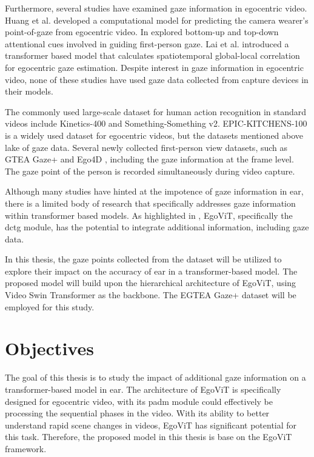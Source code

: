 Furthermore, several studies have examined gaze information in egocentric video. Huang et al. \cite{huang_predicting_2018} developed a computational model for predicting the camera wearer's point-of-gaze from egocentric video. In \cite{tavakoli_digging_2019} explored bottom-up and top-down attentional cues involved in guiding first-person gaze. Lai et al. \cite{lai_eye_2022} introduced a transformer based model that calculates spatiotemporal global-local correlation for egocentric gaze estimation. Despite interest in gaze information in egocentric video, none of these studies have used gaze data collected from capture devices in their models.

The commonly used large-scale dataset for human action recognition in standard videos include Kinetics-400 and Something-Something v2. EPIC-KITCHENS-100 is a widely used dataset for egocentric videos, but the datasets mentioned above lake of gaze data. Several newly collected first-person view datasets, such as GTEA Gaze+ \cite{li_eye_2020} and Ego4D \cite{grauman_ego4d_2022}, including the gaze information at the frame level. The gaze point of the person is recorded simultaneously during video capture.

Although many studies have hinted at the impotence of gaze information in \gls{ear}, there is a limited body of research that specifically addresses gaze information within transformer based models. As highlighted in \cite{pan_egovit_2023}, EgoViT, specifically the \gls{dctg} module, has the potential to integrate additional information, including gaze data.

In this thesis, the gaze points collected from the dataset will be utilized to explore their impact on the accuracy of \gls{ear} in a transformer-based model. The proposed model will build upon the hierarchical architecture of EgoViT, using Video Swin Transformer as the backbone. The EGTEA Gaze+ dataset will be employed for this study.
\clearpage

\section{Objectives}
\label{sec:objectives}
The goal of this thesis is to study the impact of additional gaze information on a transformer-based model in \gls{ear}. The architecture of EgoViT is specifically designed for egocentric video, with its \gls{padm} module could effectively be processing the sequential phases in the video. With its ability to better understand rapid scene changes in videos, EgoViT has significant potential for this task. Therefore, the proposed model in this thesis is base on the EgoViT framework.

